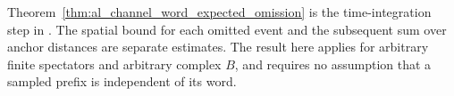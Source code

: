 Theorem~\ref{thm:al_channel_word_expected_omission} is the
time-integration step in \cite[\texttt{09-amplification.tex},
    lines 203--215]{OpenAI2026AreaLaw}. The spatial bound for each
omitted event and the subsequent sum over anchor distances are
separate estimates. The result here applies for arbitrary
finite spectators and arbitrary complex $B$, and requires no
assumption that a sampled prefix is independent of its word.
